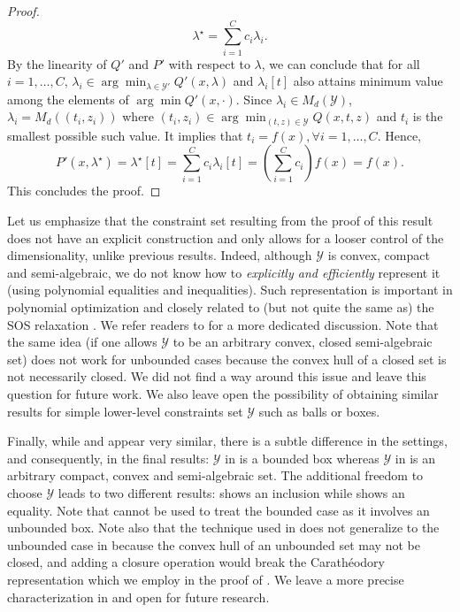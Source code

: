 \documentclass{article}
\newcommand*{\cY}{\mathcal{Y}}
\newcommand{\argmin}{\arg\min}
\theoremstyle{plain}
\theoremstyle{definition}
\begin{document}
\begin{proof}
    \begin{equation*}
        \lambda^\star = \sum_{i = 1}^C c_i\lambda_i.
    \end{equation*}
    By the linearity of $Q'$ and $P'$ with respect to $\lambda$, we can conclude that for all $i = 1, \ldots, C$, $\lambda_i \in \argmin_{\lambda \in \cY'} Q'(x, \lambda)$ and $\lambda_i[t]$ also attains minimum value among the elements of $\argmin Q'(x, \cdot)$. Since $\lambda_i \in {M_d(\cY)}$, $\lambda_i = M_d((t_i, z_i))$ where $(t_i, z_i) \in \argmin_{(t,z) \in \cY} Q(x, t, z)$ and $t_i$ is the smallest possible such value. It implies that $t_i = f(x), \forall i = 1, \ldots, C$. Hence, 
    $$P'(x, \lambda^\star) = \lambda^\star[t] = \sum_{i = 1}^C c_i\lambda_i[t] = \left(\sum_{i = 1}^C c_i\right)f(x) = f(x).$$
    This concludes the proof.
\end{proof}

Let us emphasize that the constraint set resulting from the proof of this result does not have an explicit construction and only allows for a looser control of the dimensionality, unlike previous results. Indeed, although $\cY$ is convex, compact and semi-algebraic, we do not know how to \emph{explicitly and efficiently} represent it (using polynomial equalities and inequalities). Such representation is important in polynomial optimization \cite{bach2023exponential} and closely related to (but not quite the same as) the SOS relaxation \cite{lasserre2001global,Parrilo2003SemidefinitePR}. We refer readers to \cite{bach2023exponential} for a more dedicated discussion. Note that the same idea (if one allows $\cY$ to be an arbitrary convex, closed semi-algebraic set) does not work for unbounded cases because the convex hull of a closed set is not necessarily closed. We did not find a way around this issue and leave this question for future work. We also leave open the possibility of obtaining similar results for simple lower-level constraints set $\cY$ such as balls or boxes. 

{Finally, while  and  appear very similar, there is a subtle difference in the settings, and consequently, in the final results: $\cY$ in  is a bounded box whereas $\cY$ in  is an arbitrary compact, convex and semi-algebraic set. The additional freedom to choose $\cY$ leads to two different results:  shows an inclusion while  shows an equality. Note that  cannot be used to treat the bounded case as it involves an unbounded box. Note also that the technique used in  does not generalize to the unbounded case in  because the convex hull of an unbounded set may not be closed, and adding a closure operation would break the Carathéodory representation which we employ in the proof of . We leave a more precise characterization in  and  open for future research.}
\end{document}
